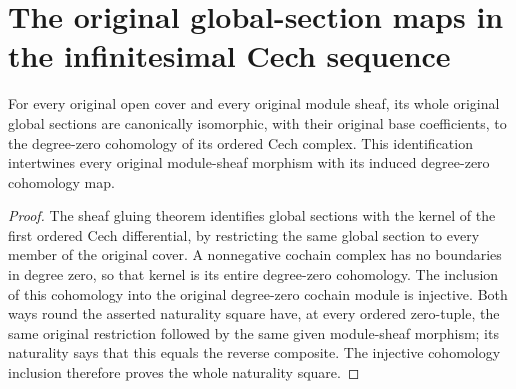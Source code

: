 \section{The original global-section maps in the infinitesimal Cech sequence}

\begin{lemma}
\label{lem:fibre-infinitesimal-global-h0-cech}
\leanok
For every original open cover and every original module sheaf, its
whole original global sections are canonically isomorphic, with their
original base coefficients, to the degree-zero cohomology of its
ordered Cech complex. This identification intertwines every original
module-sheaf morphism with its induced degree-zero cohomology map.
\end{lemma}
\begin{proof}
The sheaf gluing theorem identifies global sections with the kernel of
the first ordered Cech differential, by restricting the same global
section to every member of the original cover. A nonnegative cochain
complex has no boundaries in degree zero, so that kernel is its entire
degree-zero cohomology. The inclusion of this cohomology into the
original degree-zero cochain module is injective. Both ways round the
asserted naturality square have, at every ordered zero-tuple, the same
original restriction followed by the same given module-sheaf morphism;
its naturality says that this equals the reverse composite. The
injective cohomology inclusion therefore proves the whole naturality
square.
\end{proof}


